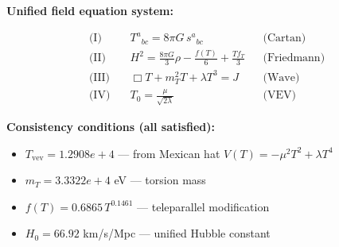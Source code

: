 
\textbf{Unified field equation system:}

\begin{align}
  \text{(I)} \quad & T^a{}_{bc} = 8\pi G \, s^a{}_{bc} && \text{(Cartan)} \\
  \text{(II)} \quad & H^2 = \frac{8\pi G}{3}\rho - \frac{f(T)}{6} + \frac{Tf_T}{3} && \text{(Friedmann)} \\
  \text{(III)} \quad & \Box T + m_T^2 T + \lambda T^3 = J && \text{(Wave)} \\
  \text{(IV)} \quad & T_0 = \frac{\mu}{\sqrt{2\lambda}} && \text{(VEV)}
\end{align}

\textbf{Consistency conditions (all satisfied):}
\begin{itemize}
  \item $T_{\text{vev}} = 1.2908e+4$ — from Mexican hat $V(T) = -\mu^2 T^2 + \lambda T^4$
  \item $m_T = 3.3322e+4$ eV — torsion mass
  \item $f(T) = 0.6865 \, T^{0.1461}$ — teleparallel modification
  \item $H_0 = 66.92$ km/s/Mpc — unified Hubble constant
\end{itemize}